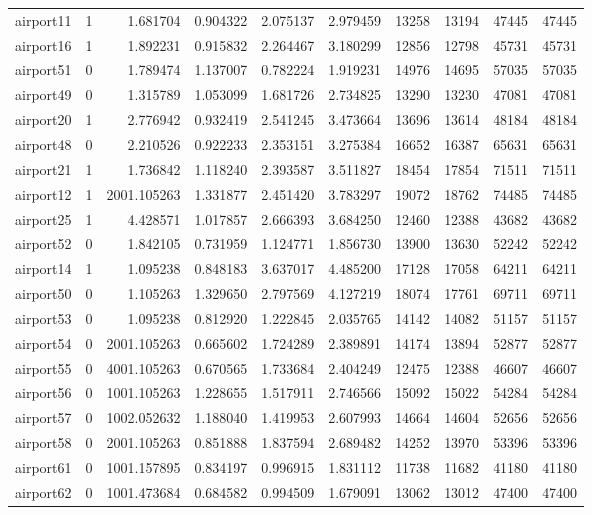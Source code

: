 \begin{longtable}{|l|r|r|r|r|r|r|r|r|r|}
airport11 & 1 & 1.681704 & 0.904322 & 2.075137 & 2.979459 & 13258 & 13194 & 47445 & 47445 \\
airport16 & 1 & 1.892231 & 0.915832 & 2.264467 & 3.180299 & 12856 & 12798 & 45731 & 45731 \\
airport51 & 0 & 1.789474 & 1.137007 & 0.782224 & 1.919231 & 14976 & 14695 & 57035 & 57035 \\
airport49 & 0 & 1.315789 & 1.053099 & 1.681726 & 2.734825 & 13290 & 13230 & 47081 & 47081 \\
airport20 & 1 & 2.776942 & 0.932419 & 2.541245 & 3.473664 & 13696 & 13614 & 48184 & 48184 \\
airport48 & 0 & 2.210526 & 0.922233 & 2.353151 & 3.275384 & 16652 & 16387 & 65631 & 65631 \\
airport21 & 1 & 1.736842 & 1.118240 & 2.393587 & 3.511827 & 18454 & 17854 & 71511 & 71511 \\
airport12 & 1 & 2001.105263 & 1.331877 & 2.451420 & 3.783297 & 19072 & 18762 & 74485 & 74485 \\
airport25 & 1 & 4.428571 & 1.017857 & 2.666393 & 3.684250 & 12460 & 12388 & 43682 & 43682 \\
airport52 & 0 & 1.842105 & 0.731959 & 1.124771 & 1.856730 & 13900 & 13630 & 52242 & 52242 \\
airport14 & 1 & 1.095238 & 0.848183 & 3.637017 & 4.485200 & 17128 & 17058 & 64211 & 64211 \\
airport50 & 0 & 1.105263 & 1.329650 & 2.797569 & 4.127219 & 18074 & 17761 & 69711 & 69711 \\
airport53 & 0 & 1.095238 & 0.812920 & 1.222845 & 2.035765 & 14142 & 14082 & 51157 & 51157 \\
airport54 & 0 & 2001.105263 & 0.665602 & 1.724289 & 2.389891 & 14174 & 13894 & 52877 & 52877 \\
airport55 & 0 & 4001.105263 & 0.670565 & 1.733684 & 2.404249 & 12475 & 12388 & 46607 & 46607 \\
airport56 & 0 & 1001.105263 & 1.228655 & 1.517911 & 2.746566 & 15092 & 15022 & 54284 & 54284 \\
airport57 & 0 & 1002.052632 & 1.188040 & 1.419953 & 2.607993 & 14664 & 14604 & 52656 & 52656 \\
airport58 & 0 & 2001.105263 & 0.851888 & 1.837594 & 2.689482 & 14252 & 13970 & 53396 & 53396 \\
airport61 & 0 & 1001.157895 & 0.834197 & 0.996915 & 1.831112 & 11738 & 11682 & 41180 & 41180 \\
airport62 & 0 & 1001.473684 & 0.684582 & 0.994509 & 1.679091 & 13062 & 13012 & 47400 & 47400 \\

\end{longtable}
